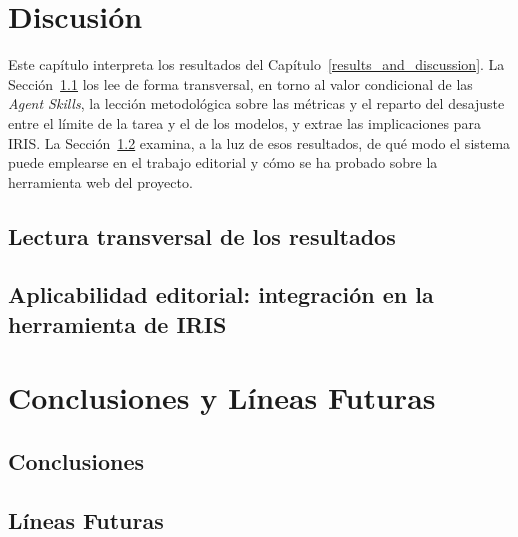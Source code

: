 \documentclass[12pt]{report} %
\renewcommand{\_}{\origunderscore\allowbreak}
\begin{document}




\chapter{Discusión}
\label{discussion_chapter}
Este capítulo interpreta los resultados del Capítulo~\ref{results_and_discussion}.
La Sección~\ref{sec:discussion} los lee de forma transversal, en torno al valor
condicional de las \textit{Agent Skills}, la lección metodológica sobre las métricas
y el reparto del desajuste entre el límite de la tarea y el de los modelos, y extrae
las implicaciones para IRIS. La Sección~\ref{poc} examina, a la luz de esos
resultados, de qué modo el sistema puede emplearse en el trabajo editorial y cómo se
ha probado sobre la herramienta web del proyecto.

\section{Lectura transversal de los resultados}
\label{sec:discussion}



\section{Aplicabilidad editorial: integración en la herramienta de IRIS}
\label{poc}




\chapter{Conclusiones y Líneas Futuras}


\section{Conclusiones}
\label{sec:conclusions}


\section{Líneas Futuras}
\label{sec:futurework_usecases}

\end{document}
